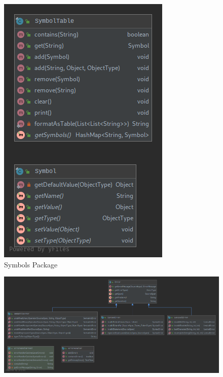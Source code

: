 \documentclass[
]{report}
\begin{document}
\begin{appendices}
\begin{figure}
		\includegraphics[width=\textwidth]{symbols-package-diagram}
		\caption{Symbols Package}
		\label{fig:symbols-package-diagram}
	\end{figure}
	\begin{figure}
		\centering
		\includegraphics[width=\textwidth]{errors-package-diagram}

\end{figure}
\end{appendices}
\end{document}
